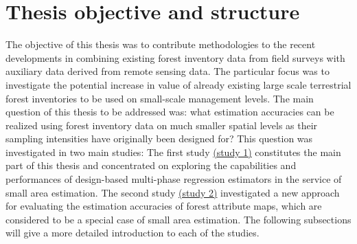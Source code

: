 






\newpage
\section{Thesis objective and structure}
\label{sec:intro:obj_and_struct}

The objective of this thesis was to contribute methodologies to the recent developments in combining existing forest inventory data from field surveys with auxiliary data derived from remote sensing data. The particular focus was to investigate the potential increase in value of already existing large scale terrestrial forest inventories to be used on small-scale management levels. The main question of this thesis to be addressed was: what estimation accuracies can be realized using forest inventory data on much smaller spatial levels as their sampling intensities have originally been designed for? This question was investigated in two main studies: The first study \hyperref[sec:study1]{(study 1)} constitutes the main part of this thesis and concentrated on exploring the capabilities and performances of design-based multi-phase regression estimators in the service of small area estimation. The second study \hyperref[sec:study2]{(study 2)} investigated a new approach for evaluating the estimation accuracies of forest attribute maps, which are considered to be a special case of small area estimation. The following subsections will give a more detailed introduction to each of the studies.


